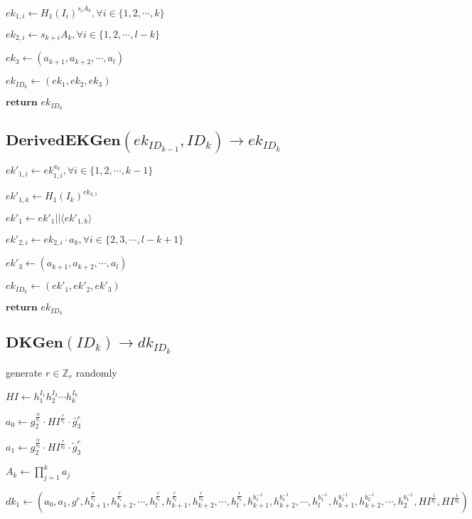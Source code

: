 \documentclass[a4paper]{article}
\begin{document}
$\textit{ek}_{1, i} \gets H_1(I_i)^{s_i A_k}, \forall i \in \{1, 2, \cdots, k\}$

$\textit{ek}_{2, i} \gets s_{k + i}A_k, \forall i \in \{1, 2, \cdots, l - k\}$

$\textit{ek}_3 \gets (a_{k + 1}, a_{k + 2}, \cdots, a_l)$

$\textit{ek}_{\textit{ID}_k} \gets (\textit{ek}_1, \textit{ek}_2, \textit{ek}_3)$

$\textbf{return }\textit{ek}_{\textit{ID}_k}$

\subsection{$\textbf{DerivedEKGen}(\textit{ek}_{\textit{ID}_{k - 1}}, \textit{ID}_k) \rightarrow \textit{ek}_{\textit{ID}_k}$}

$\textit{ek}'_{1, i} \gets \textit{ek}_{1, i}^{a_k}, \forall i \in \{1, 2, \cdots, k - 1\}$

$\textit{ek}'_{1, k} \gets H_1(I_k)^{\textit{ek}_{2, 1}}$

$\textit{ek}'_1 \gets \textit{ek}'_1 || \langle\textit{ek}'_{1, k}\rangle$

$\textit{ek}'_{2, i} \gets \textit{ek}_{2, i} \cdot a_k, \forall i \in \{2, 3, \cdots, l - k + 1\}$

$\textit{ek}'_3 \gets (a_{k + 1}, a_{k + 2}, \cdots, a_l)$

$\textit{ek}_{\textit{ID}_k} \gets (\textit{ek}'_1, \textit{ek}'_2, \textit{ek}'_3)$

$\textbf{return }\textit{ek}_{\textit{ID}_k}$

\subsection{$\textbf{DKGen}(\textit{ID}_k) \rightarrow \textit{dk}_{\textit{ID}_k}$}

generate $r \in \mathbb{Z}_r$ randomly

$\textit{HI} \gets h_1^{I_1} h_2^{I_2} \cdots h_k^{I_k}$

$a_0 \gets g_2^{\frac{\alpha}{b_1}} \cdot \textit{HI}^{\frac{r}{b_1}} \cdot \bar{g}_3^r$

$a_1 \gets g_2^{\frac{\alpha}{b_2}} \cdot \textit{HI}^{\frac{r}{b_2}} \cdot \tilde{g}_3^r$

$A_k \gets \prod\limits_{j = 1}^k a_j$

$\textit{dk}_1 \gets (
a_0, a_1, g^r,\allowbreak 
h_{k + 1}^{\frac{r}{b_1}}, h_{k + 2}^{\frac{r}{b_1}}, \cdots, h_l^{\frac{r}{b_1}},\allowbreak 
h_{k + 1}^{\frac{r}{b_2}}, h_{k + 2}^{\frac{r}{b_2}}, \cdots, h_l^{\frac{r}{b_2}},\allowbreak 
h_{k + 1}^{b_1^{-1}}, h_{k + 2}^{b_1^{-1}}, \cdots, h_l^{b_1^{-1}},\allowbreak 
h_{k + 1}^{b_2^{-1}}, h_{k + 2}^{b_2^{-1}}, \cdots, h_2^{b_1^{-1}},\allowbreak 
\textit{HI}^{\frac{1}{b_1}}, \textit{HI}^{\frac{1}{b_2}}
)$
\end{document}
